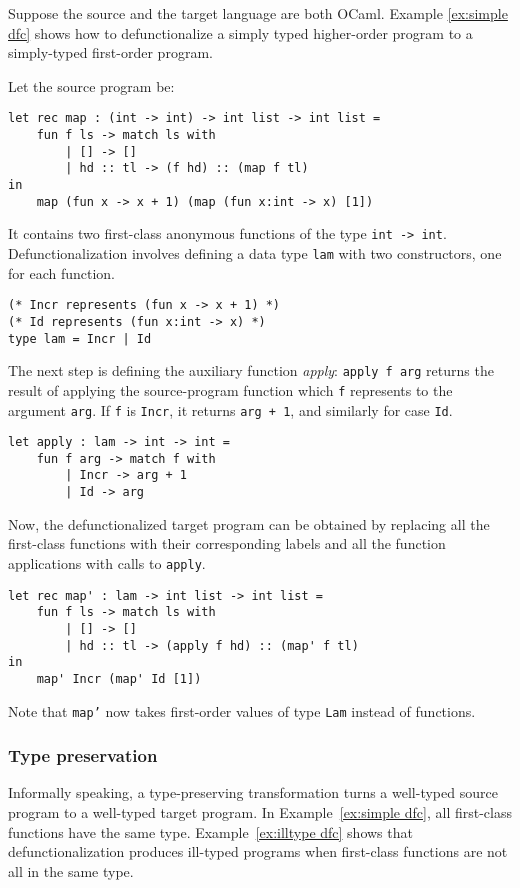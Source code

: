 Suppose the source and the target language are both OCaml. Example \ref{ex:simple dfc} shows how to defunctionalize a simply typed higher-order program to a simply-typed first-order program.
\begin{exmp}
\label{ex:simple dfc}
Let the source program be:
\begin{lstlisting}
let rec map : (int -> int) -> int list -> int list =
    fun f ls -> match ls with
        | [] -> []
        | hd :: tl -> (f hd) :: (map f tl)
in
    map (fun x -> x + 1) (map (fun x:int -> x) [1])
\end{lstlisting}
It contains two first-class anonymous functions of the type \texttt{int -> int}. Defunctionalization involves defining a data type \texttt{lam} with two constructors, one for each function.
\begin{lstlisting}
(* Incr represents (fun x -> x + 1) *)
(* Id represents (fun x:int -> x) *)
type lam = Incr | Id
\end{lstlisting}
The next step is defining the auxiliary function \textit{apply}: \texttt{apply f arg} returns the result of
applying the source-program function which \texttt{f} represents to the argument \texttt{arg}. If \texttt{f} is \texttt{Incr}, it returns \texttt{arg + 1}, and similarly for case \texttt{Id}.
\begin{lstlisting}
let apply : lam -> int -> int = 
    fun f arg -> match f with
        | Incr -> arg + 1
        | Id -> arg 
\end{lstlisting}
Now, the defunctionalized target program can be obtained by replacing all the first-class functions with their corresponding labels and all the function applications with calls to \texttt{apply}.
\begin{lstlisting}
let rec map' : lam -> int list -> int list =
    fun f ls -> match ls with
        | [] -> []
        | hd :: tl -> (apply f hd) :: (map' f tl)
in
    map' Incr (map' Id [1])
\end{lstlisting}
Note that \texttt{map'} now takes first-order values of type \texttt{Lam} instead of functions.
\end{exmp}

\subsubsection{Type preservation}
Informally speaking, a type-preserving transformation turns a well-typed source program to a well-typed target program.
In Example~\ref{ex:simple dfc}, all first-class functions have the same type. Example~\ref{ex:illtype dfc} shows that defunctionalization produces ill-typed programs when first-class functions are not all in the same type.

